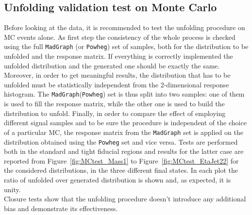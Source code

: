 \clearpage
\subsection{Unfolding validation test on Monte Carlo}
Before looking at the data, it is recommended to test the unfolding procedure on MC events alone. 
As first step the consistency of the whole process is checked using the full \texttt{MadGraph} (or \texttt{Powheg}) set of samples,
both for the distribution to be unfolded and the response matrix. If everything is
correctly implemented the unfolded distribution and the generated one should be exactly the
same. Moreover, in order to get meaningful results, the distribution that has to be unfolded must be statistically independent 
from the 2-dimensional response histogram. The \texttt{MadGraph}(\texttt{Powheg}) set is thus split into two samples: one of them
is used to fill the response matrix, while the other one is used to build the distribution to unfold. Finally, in order to compare the effect of employing different signal samples and to be sure the procedure is
independent of the choice of a particular MC, the response matrix from the \texttt{MadGraph} set is applied on the distribution 
obtained using the \texttt{Powheg} set and vice versa. Tests are performed both in the standard and tight fiducial regions and results for the latter case are reported from Figure~\ref{fig:MCtest_Mass1} to Figure~\ref{fig:MCtest_EtaJet22} for the considered distributions, in the three different final states. In each plot the ratio of unfolded over generated
distribution is shown and, as expected, it is unity. \\
Closure tests show that the unfolding procedure doesn't introduce any additional bias and demonstrate its effectiveness. 




